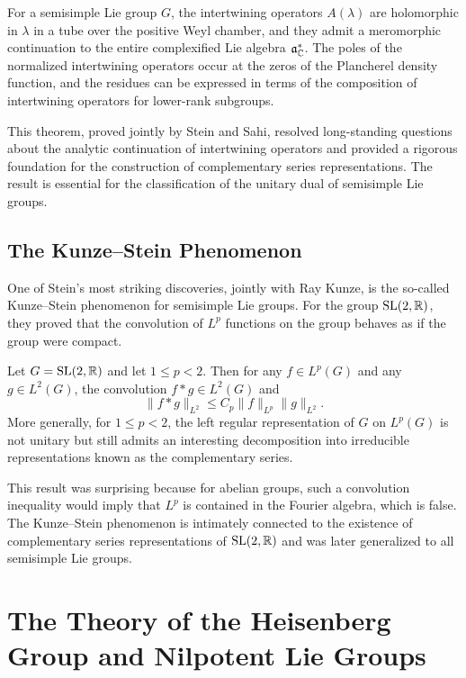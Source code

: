 \begin{theorem}
For a semisimple Lie group \(G\), the intertwining operators \(A(\lambda)\) are holomorphic in \(\lambda\) in a tube over the positive Weyl chamber, and they admit a meromorphic continuation to the entire complexified Lie algebra \(\mathfrak{a}^*_{\mathbb{C}}\). The poles of the normalized intertwining operators occur at the zeros of the Plancherel density function, and the residues can be expressed in terms of the composition of intertwining operators for lower-rank subgroups.
\end{theorem}

This theorem, proved jointly by Stein and Sahi, resolved long-standing questions about the analytic continuation of intertwining operators and provided a rigorous foundation for the construction of complementary series representations. The result is essential for the classification of the unitary dual of semisimple Lie groups.

\subsection{The Kunze--Stein Phenomenon}

One of Stein's most striking discoveries, jointly with Ray Kunze, is the so-called Kunze--Stein phenomenon for semisimple Lie groups. For the group \(\operatorname{SL}(2,\mathbb{R})\), they proved that the convolution of \(L^p\) functions on the group behaves as if the group were compact.

\begin{theorem}
Let \(G = \operatorname{SL}(2,\mathbb{R})\) and let \(1 \leq p < 2\). Then for any \(f \in L^p(G)\) and any \(g \in L^2(G)\), the convolution \(f * g \in L^2(G)\) and
\[
\|f * g\|_{L^2} \leq C_p \|f\|_{L^p} \|g\|_{L^2}.
\]
More generally, for \(1 \leq p < 2\), the left regular representation of \(G\) on \(L^p(G)\) is not unitary but still admits an interesting decomposition into irreducible representations known as the complementary series.
\end{theorem}

This result was surprising because for abelian groups, such a convolution inequality would imply that \(L^p\) is contained in the Fourier algebra, which is false. The Kunze--Stein phenomenon is intimately connected to the existence of complementary series representations of \(\operatorname{SL}(2,\mathbb{R})\) and was later generalized to all semisimple Lie groups.

\section{The Theory of the Heisenberg Group and Nilpotent Lie Groups}

